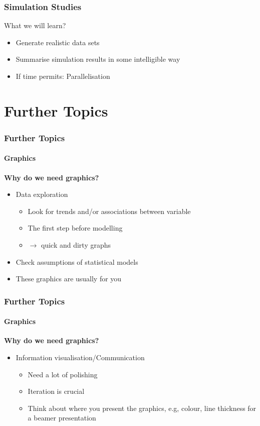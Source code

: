 \documentclass[paper=screen,mathserif]{beamer}\usepackage[]{graphicx}\usepackage[]{color}
\newcommand{\ft}[1]{\frametitle{#1}}
\newcommand{\fst}[1]{\framesubtitle{#1}}
\begin{document}
\begin{frame}
  \frametitle{Simulation Studies}
  What we will learn?
  \begin{itemize}
  \item Generate realistic data sets
  \item Summarise simulation results in some intelligible way
  \item If time permits: Parallelisation
  \end{itemize}
\end{frame}

\section{Further Topics}

\begin{frame}
  \ft{Further Topics}
  \fst{Graphics}
  
  {\bf Why do we need graphics?}
  \begin{itemize}
  \item Data exploration
    \begin{itemize}
    \item Look for trends and/or associations between variable
    \item The first step before modelling
    \item $\rightarrow$ quick and dirty graphs
    \end{itemize}
  \item Check assumptions of statistical models
  \item These graphics are usually for you
  \end{itemize}
\end{frame}

\begin{frame}
  \ft{Further Topics}
  \fst{Graphics}
  
  {\bf Why do we need graphics?}
  \begin{itemize}
  \item Information visualisation/Communication
    \begin{itemize}
    \item Need a lot of polishing
    \item Iteration is crucial
    \item Think about where you present the graphics, e.g, colour,
      line thickness for a beamer presentation
    \end{itemize}
  \end{itemize}
\end{frame}
\end{document}
